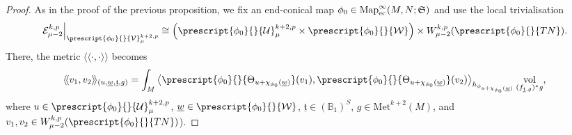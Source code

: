 \documentclass{article}
\numberwithin{equation}{section}        %
\theoremstyle{bfnote}
\theoremstyle{definition}
\theoremstyle{bfremark}
\newcommand{\Map}{\mathrm{Map}}             %
\newcommand{\Met}{\mathrm{Met}}             %
\newcommand{\pairl}{\langle \! \langle}     %
\newcommand{\pairr}{\rangle \! \rangle}     %
\DeclareMathOperator{\vol}{vol}                 %
\begin{document}
\begin{proof}
    As in the proof of the previous proposition, we fix an end-conical map $\phi_0 \in \Map^{\infty}_{\textup{ec}}(M,N;\mathfrak{S})$ and use the local trivialisation
    \begin{align*}
        \left. \mathcal{E}^{k,p}_{\mu-2}\right|_{\prescript{\phi_0}{}{\mathcal{V}}^{k+2,p}_\mu} \cong \left(\prescript{\phi_0}{}{\mathcal{U}}^{k+2,p}_\mu \times \prescript{\phi_0}{}{\mathcal{W}} \right) \times W^{k,p}_{\mu-2}(\prescript{\phi_0}{}{TN}) .
    \end{align*}
    There, the metric $\pairl \cdot,\cdot \pairr$ becomes
    \begin{equation*}
        \pairl v_1,v_2\pairr_{(u,\underline{w},\underline{\mathfrak{t}},g)} = \int_M \big\langle \prescript{\phi_0}{}{\Theta_{u+\chi_{\phi_0}(\underline{w})}}(v_1),\prescript{\phi_0}{}{\Theta_{u+\chi_{\phi_0}(\underline{w})}}(v_2) \big\rangle_{h_{\phi_{u+\chi_{\phi_0}(\underline{w})}}} \vol_{(f_{\underline{\mathfrak{t}},g})^*g} , 
    \end{equation*} 
    where $u\in \prescript{\phi_0}{}{\mathcal{U}}^{k+2,p}_\mu$, $\underline{w} \in \prescript{\phi_0}{}{\mathcal{W}}$, $\underline{\mathfrak{t}}\in (\mathbb{B}_1)^S$, $g\in \Met^{k+2}(M)$, and $v_1,v_2 \in W^{k,p}_{\mu-2}(\prescript{\phi_0}{}{TN})$). 
    

\end{proof}
\end{document}
